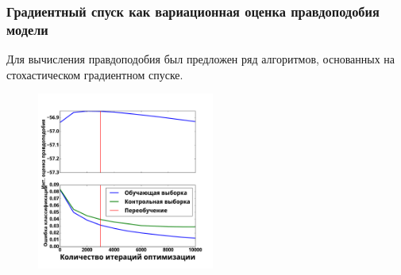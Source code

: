 \documentclass[usenames,dvipsnames,11pt,pdf,utf8,russian,aspectratio=43]{beamer}
\begin{document}
\begin{frame}
\frametitle{Градиентный спуск как вариационная оценка правдоподобия модели}
Для вычисления правдоподобия был предложен ряд алгоритмов, основанных на стохастическом градиентном спуске.
\footnotesize

\begin{multicols}{2}

\begin{figure}
\vspace*{-0.2cm}
\end{figure}

\columnbreak


\begin{figure}
{\includegraphics[width=0.52\textwidth]{./slide_plots/sgd_show.pdf}}
\end{figure}
\end{multicols}
\end{frame}
\end{document}
